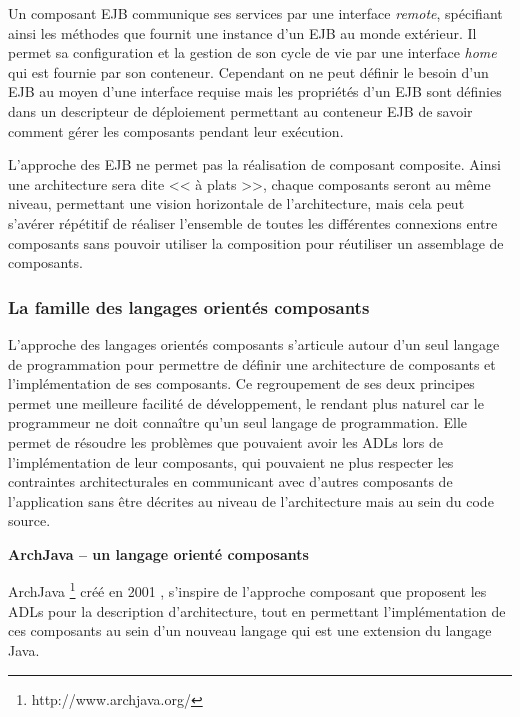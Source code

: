     Un composant EJB communique ses services par une interface \emph{remote}, spécifiant ainsi les méthodes que fournit une instance d'un EJB au monde extérieur. Il permet sa configuration et la gestion de son cycle de vie par une interface \emph{home} qui est fournie par son conteneur. Cependant on ne peut définir le besoin d'un EJB au moyen d'une interface requise mais les propriétés d'un EJB sont définies dans un descripteur de déploiement permettant au conteneur EJB de savoir comment gérer les composants pendant leur exécution.
    
    L’approche des EJB ne permet pas la réalisation de composant composite. Ainsi une architecture sera dite << à plats >>, chaque composants seront au même niveau, permettant une vision horizontale de l'architecture, mais cela peut s’avérer répétitif de réaliser l'ensemble de toutes les différentes connexions entre composants sans pouvoir utiliser la composition pour réutiliser un assemblage de composants.
         
    \subsubsection{La famille des langages orientés composants}
    
    \label{sec:presentcomponent}
    
    L'approche des langages orientés composants s'articule autour d'un seul langage de programmation pour permettre de définir une architecture de composants et l'implémen\-ta\-tion de ses composants. Ce regroupement de ses deux principes permet une meilleure facilité de développement, le rendant plus naturel car le programmeur ne doit connaître qu'un seul langage de programmation. Elle permet de résoudre les problèmes que pouvaient avoir les ADLs lors de l'implémentation de leur composants, qui pouvaient ne plus respecter les contraintes architecturales en communicant avec d'autres composants de l'application sans être décrites au niveau de l'architecture mais au sein du code source. \\\par 
    
      \textbf{ArchJava -- un langage orienté composants} 
      
      ArchJava \footnote{http://www.archjava.org/} créé en 2001 \cite{aldrich2002archjava}, s'inspire de l'approche composant que proposent les ADLs pour la description d'architecture, tout en permettant l'implémentation de ces composants au sein d'un nouveau langage qui est une extension du langage Java.
      

